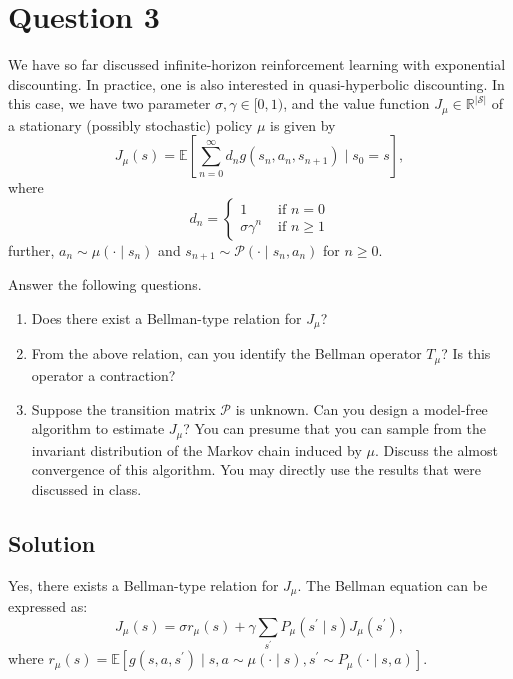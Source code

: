 \section*{Question 3}

We have so far discussed infinite-horizon reinforcement learning with exponential discounting.
In practice, one is also interested in quasi-hyperbolic discounting.
In this case, we have two parameter \( \sigma, \gamma \in [0,1) \), and the value function \( J_{\mu} \in \mathbb{R}^{\vert\mathcal{S}\vert} \) of a stationary (possibly stochastic) policy \( \mu \) is given by
\[
    J_{\mu}(s)=\mathbb{E}\left[\sum_{n=0}^{\infty} d_{n} g\left(s_{n}, a_{n}, s_{n+1}\right) \mid s_{0}=s\right],
\]
where
\[
    d_{n}= \begin{cases}1 & \text { if } n=0 \\ \sigma \gamma^{n} & \text { if } n \geq 1\end{cases}
\]
further, \( a_{n} \sim \mu\left(\cdot \mid s_{n}\right) \) and \( s_{n+1} \sim \mathcal{P}\left(\cdot \mid s_{n}, a_{n}\right) \) for \( n \geq 0 \).

Answer the following questions.
\begin{enumerate}[label= (\alph*), noitemsep]
    \item Does there exist a Bellman-type relation for \( J_{\mu} \)?
    \item From the above relation, can you identify the Bellman operator \( T_{\mu} \)?
          Is this operator a contraction?
    \item Suppose the transition matrix \( \mathcal{P} \) is unknown.
          Can you design a model-free algorithm to estimate \( J_{\mu} \)?
          You can presume that you can sample from the invariant distribution of the Markov chain induced by \( \mu \).
          Discuss the almost convergence of this algorithm.
          You may directly use the results that were discussed in class.
\end{enumerate}

\subsection*{Solution}

Yes, there exists a Bellman-type relation for \( J_{\mu} \).
The Bellman equation can be expressed as:
\[
    J_{\mu}(s)=\sigma r_{\mu}(s)+\gamma \sum_{s^{\prime}} P_{\mu}\left(s^{\prime} \mid s\right) J_{\mu}(s^{\prime}),
\]
where \( r_{\mu}(s)=\mathbb{E}\left[g\left(s, a, s^{\prime}\right) \mid s, a \sim \mu\left(\cdot \mid s\right), s^{\prime} \sim P_{\mu}\left(\cdot \mid s, a\right)\right] \).


